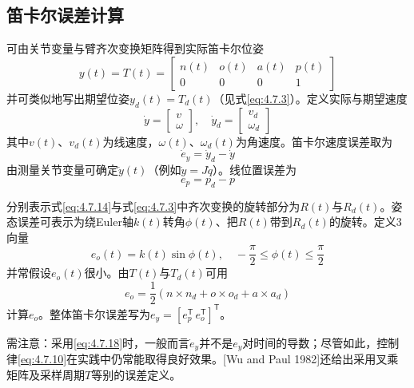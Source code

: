\documentclass[UTF8]{ctexart}
\theoremstyle{definition}
\begin{document}
\subsection{笛卡尔误差计算}

\setcounter{equation}{13}
可由关节变量与臂齐次变换矩阵得到实际笛卡尔位姿
\begin{equation}\label{eq:4.7.14}
    y(t) = T(t) = \begin{bmatrix} n(t) & o(t) & a(t) & p(t) \\ 0 & 0 & 0 & 1 \end{bmatrix}
\end{equation}
并可类似地写出期望位姿$y_d(t)=T_d(t)$（见式\eqref{eq:4.7.3}）。定义实际与期望速度
\begin{equation}\label{eq:4.7.15}
    \dot{y} = \begin{bmatrix} v \\ \omega \end{bmatrix}, \quad \dot{y}_d = \begin{bmatrix} v_d \\ \omega_d \end{bmatrix}
\end{equation}
其中$v(t)$、$v_d(t)$为线速度，$\omega(t)$、$\omega_d(t)$为角速度。笛卡尔速度误差取为
\begin{equation}\label{eq:4.7.16}
    \dot{e}_y = \dot{y}_d - \dot{y}
\end{equation}
由测量关节变量可确定$\dot{y}(t)$（例如$\dot{y}=J\dot{q}$）。线位置误差为
\begin{equation}\label{eq:4.7.17}
    e_p = p_d - p
\end{equation}

分别表示式\eqref{eq:4.7.14}与式\eqref{eq:4.7.3}中齐次变换的旋转部分为$R(t)$与$R_d(t)$。姿态误差可表示为绕Euler轴$k(t)$转角$\phi(t)$、把$R(t)$带到$R_d(t)$的旋转。定义3向量
\begin{equation}\label{eq:4.7.18}
    e_o(t) = k(t)\sin\phi(t), \quad -\frac{\pi}{2} \leq \phi(t) \leq \frac{\pi}{2}
\end{equation}
并常假设$e_o(t)$很小。由$T(t)$与$T_d(t)$可用
\begin{equation}\label{eq:4.7.19}
    e_o = \frac{1}{2}(n \times n_d + o \times o_d + a \times a_d)
\end{equation}
计算$e_o$。整体笛卡尔误差写为$e_y = [e_p^{\mathsf{T}} \, e_o^{\mathsf{T}}]^{\mathsf{T}}$。

需注意：采用\eqref{eq:4.7.18}时，一般而言$\dot{e}_y$并不是$e_y$对时间的导数；尽管如此，控制律\eqref{eq:4.7.10}在实践中仍常能取得良好效果。[Wu and Paul 1982]还给出采用叉乘矩阵及采样周期$T$等别的误差定义。
\end{document}

